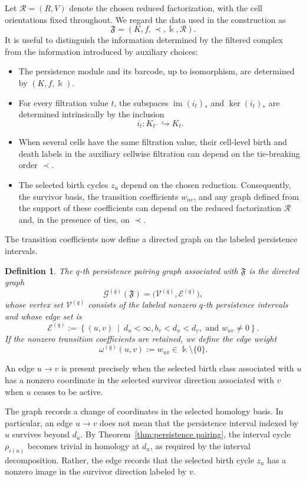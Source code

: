 \documentclass[11pt]{article}
\theoremstyle{paperdefinition}
\newtheorem{definition}{Definition}[section]
\theoremstyle{paperplain}
\theoremstyle{paperremark}
\begin{document}
Let $\mathcal R=(R,V)$ denote the chosen reduced factorization, with the cell orientations fixed throughout. We regard the data used in the construction as
\[
\mathfrak F = (K,f,\prec,\Bbbk,\mathcal R).
\]
It is useful to distinguish the information determined by the filtered complex from the information introduced by auxiliary choices:
\begin{itemize}
\item The persistence module and its barcode, up to isomorphism, are determined by $(K,f,\Bbbk)$.
\item For every filtration value $t$, the subspaces $\operatorname{im}(i_t)_*$ and $\ker(i_t)_*$ are determined intrinsically by the inclusion
\[
i_t:K_{t^-}\hookrightarrow K_t.
\]
\item When several cells have the same filtration value, their cell-level birth and death labels in the auxiliary cellwise filtration can depend on the tie-breaking order $\prec$.
\item The selected birth cycles $z_u$ depend on the chosen reduction. Consequently, the survivor basis, the transition coefficients $w_{uv}$, and any graph defined from the support of these coefficients can depend on the reduced factorization $\mathcal R$ and, in the presence of ties, on $\prec$.
\end{itemize}

The transition coefficients now define a directed graph on the labeled persistence intervals.

\begin{definition}
\label{def:persistence pairing-graph}
The $q$-th \emph{persistence pairing graph} associated with $\mathfrak F$ is the directed graph
\[
\mathcal G^{(q)}(\mathfrak F) = \bigl(\mathcal V^{(q)},\mathcal E^{(q)}\bigr),
\]
whose vertex set $\mathcal V^{(q)}$ consists of the labeled nonzero $q$-th persistence intervals and whose edge set is
\[
\mathcal E^{(q)} := \left\{(u,v) \ \middle|\ d_u<\infty, b_v<d_u<d_v, \text{ and } w_{uv}\neq 0\right\}.
\]
If the nonzero transition coefficients are retained, we define the edge weight
\[
\omega^{(q)}(u,v) := w_{uv} \in \Bbbk\setminus\{0\}.
\]
\end{definition}

An edge $u\longrightarrow v$ is present precisely when the selected birth class associated with $u$ has a nonzero coordinate in the selected survivor direction associated with $v$ when $u$ ceases to be active.

The graph records a change of coordinates in the selected homology basis. In particular, an edge $u\longrightarrow v$ does not mean that the persistence interval indexed by $u$ survives beyond $d_u$. By Theorem~\ref{thm:persistence pairing}, the interval cycle $\rho_{i(u)}$ becomes trivial in homology at $d_u$, as required by the interval decomposition. Rather, the edge records that the selected birth cycle $z_u$ has a nonzero image in the survivor direction labeled by $v$.
\end{document}
